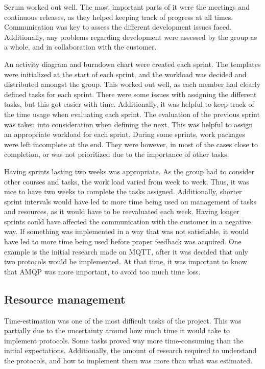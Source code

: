 Scrum worked out well. The most important parts of it were the meetings and continuous releases, as they helped keeping track of progress at all times. Communication was key to assess the different development issues faced. Additionally, any problems regarding development were assessed by the group as a whole, and in collaboration with the customer.

An activity diagram and burndown chart were created each sprint. The templates were initialized at the start of each sprint, and the workload was decided and distributed amongst the group. This worked out well, as each member had clearly defined tasks for each sprint. There were some issues with assigning the different tasks, but this got easier with time. Additionally, it was helpful to keep track of the time usage when evaluating each sprint. The evaluation of the previous sprint was taken into consideration when defining the next. This was helpful to assign an appropriate workload for each sprint. During some sprints, work packages were left incomplete at the end. They were however, in most of the cases close to completion, or was not prioritized due to the importance of other tasks.

Having sprints lasting two weeks was appropriate. As the group had to consider other courses and tasks, the work load varied from week to week. Thus, it was nice to have two weeks to complete the tasks assigned. Additionally, shorter sprint intervals would have led to more time being used on management of tasks and resources, as it would have to be reevaluated each week. Having longer sprints could have affected the communication with the customer in a negative way. If something was implemented in a way that was not satisfiable, it would have led to more time being used before proper feedback was acquired. One example is the initial research made on MQTT, after it was decided that only two protocols would be implemented. At that time, it was important to know that AMQP was more important, to avoid too much time loss.

\subsection{Resource management}
\label{subsec:project_evaluation-development-time_management}

Time-estimation was one of the most difficult tasks of the project. This was partially due to the uncertainty around how much time it would take to implement protocols. Some tasks proved way more time-consuming than the initial expectations. Additionally, the amount of research required to understand the protocols, and how to implement them was more than what was estimated.

